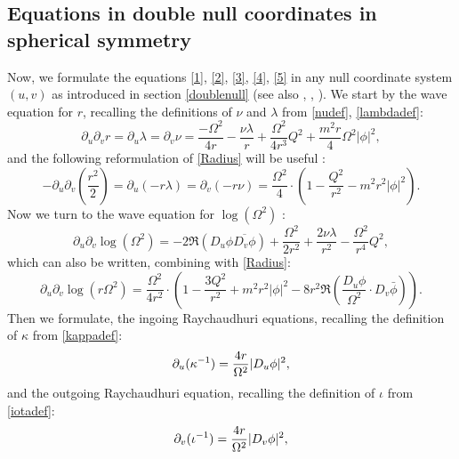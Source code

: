 \documentclass[10pt,a4paper]{article}
\theoremstyle{plain}
\theoremstyle{remark}
\theoremstyle{definition}
\theoremstyle{plain}
\theoremstyle{remark}
\theoremstyle{definition}
\numberwithin{equation}{section}
\begin{document}
\subsection{Equations in double null coordinates in spherical symmetry} 	Now, we formulate the equations \eqref{1}, \eqref{2}, \eqref{3}, \eqref{4}, \eqref{5} in any null coordinate system $(u,v)$ as introduced in section \ref{doublenull} (see also \cite{MihalisPHD}, \cite{JonathanStab}, \cite{Kommemi})\color{black}. We start by the wave equation for $r$, recalling the definitions of $\nu$ and $\lambda$ from \eqref{nudef}, \eqref{lambdadef}:
\begin{equation}\label{Radius}\partial_{u}\partial_{v}r = \partial_u \lambda = \partial_v \nu =\frac{- \Omega^{2}}{4r}-\frac{\nu \lambda}{r}
+\frac{ \Omega^{2}}{4r^{3}} Q^2 +  \frac{m^{2}r }{4} \Omega^2 |\phi|^{2} , \end{equation}
and the following reformulation of \eqref{Radius} will be  useful :		
\begin{equation} \label{Radius3}
-\partial_u  \partial_v (\frac{r^2}{2})	=\partial_u (-r  \lambda) =	\partial_v (-r  \nu ) = \frac{\Omega^2}{4}\cdot (1- \frac{Q^2}{r^2}-m^2 r^2 |\phi|^2).
\end{equation}
Now we turn to the wave equation for $\log(\Omega^2)$ :\begin{equation}\label{Omega}
\partial_{u}\partial_{v} \log(\Omega^2)=-2\Re(D_{u} \phi \overline{D_{v}\phi})+\frac{ \Omega^{2}}{2r^{2}}+\frac{2 \nu \lambda}{r^{2}}- \frac{\Omega^{2}}{r^{4}} Q^2,
\end{equation}
which can also be written, combining with \eqref{Radius}:
\begin{equation}\label{Omega3}
\partial_{u}\partial_{v} \log(r\Omega^2)=  \frac{ \Omega^{2}}{4r^{2}} \cdot \left(1-   \frac{3Q^2}{r^{2}} +m^{2}r^2 |\phi|^{2} - 8 r^2\Re( \frac{D_{u}\phi}{\Omega^2} \cdot  D_{v}\bar{\phi})  \right).
\end{equation}
Then we formulate, the ingoing Raychaudhuri equations, recalling the definition of $\kappa$ from \eqref{kappadef}: 
\begin{equation}\label{RaychU}\partial_u( \kappa^{-1})=\frac {4r}{\Omega^{2}}|  D_{u} \color{black}\phi|^{2}, \end{equation}%
and the outgoing Raychaudhuri equation, recalling the definition of $\iota$ from \eqref{iotadef}:
\begin{equation} \label{RaychV}\partial_v( \iota^{-1})=\frac {4r}{\Omega^{2}}|  D_{v} \color{black}\phi|^{2},\end{equation}
\end{document}
